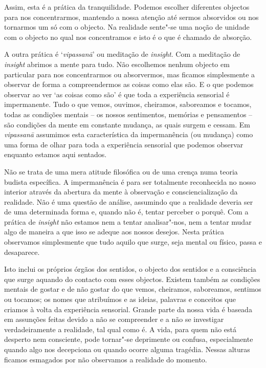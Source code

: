 Assim, esta é a prática da tranquilidade. Podemos escolher diferentes
objectos para nos concentrarmos, mantendo a nossa atenção até sermos
absorvidos ou nos tornarmos um só com o objecto. Na realidade sente"-se
uma noção de unidade com o objecto no qual nos concentramos e isto é o
que é chamado de absorção.

A outra prática é `\emph{vipassanā}' ou meditação de \emph{insight}. Com
a meditação de \emph{insight} abrimos a mente para tudo. Não escolhemos
nenhum objecto em particular para nos concentrarmos ou absorvermos, mas
ficamos simplesmente a observar de forma a compreendermos as coisas como
elas são. E o que podemos observar ao ver `as coisas como são' é que
toda a experiência sensorial é impermanente. Tudo o que vemos, ouvimos,
cheiramos, saboreamos e tocamos, todas as condições mentais -- os nossos
sentimentos, memórias e pensamentos -- são condições da mente em
constante mudança, as quais surgem e cessam. Em \emph{vipassanā}
assumimos esta característica da impermanência (ou mudança) como uma
forma de olhar para toda a experiência sensorial que podemos observar
enquanto estamos aqui sentados.

Não se trata de uma mera atitude filosófica ou de uma crença numa teoria
budista específica. A impermanência é para ser totalmente reconhecida no
nosso interior através da abertura da mente à observação e
consciencialização da realidade. Não é uma questão de análise, assumindo
que a realidade deveria ser de uma determinada forma e, quando não é,
tentar perceber o porquê. Com a prática de \emph{insight} não estamos
nem a tentar analisar"-nos, nem a tentar mudar algo de maneira a que isso
se adeque aos nossos desejos. Nesta prática observamos simplesmente que
tudo aquilo que surge, seja mental ou físico, passa e desaparece.

Isto inclui os próprios órgãos dos sentidos, o objecto dos sentidos e a
consciência que surge aquando do contacto com esses objectos. Existem
também as condições mentais de gostar e de não gostar do que vemos,
cheiramos, saboreamos, sentimos ou tocamos; os nomes que atribuímos e as
ideias, palavras e conceitos que criamos à volta da experiência
sensorial. Grande parte da nossa vida é baseada em assunções feitas
devido a não se compreender e a não se investigar verdadeiramente a
realidade, tal qual como é. A vida, para quem não está desperto nem
consciente, pode tornar"-se deprimente ou confusa, especialmente quando
algo nos decepciona ou quando ocorre alguma tragédia. Nessas alturas
ficamos esmagados por não observamos a realidade do momento.

